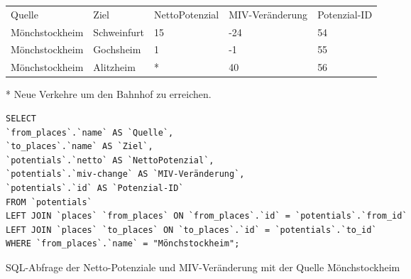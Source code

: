 \begin{tabular}{ l  l  l  l  l }
Quelle & Ziel & NettoPotenzial & MIV-Veränderung & Potenzial-ID\\ 
Mönchstockheim & Schweinfurt & 15 & -24 & 54\\ 
Mönchstockheim & Gochsheim & 1 & -1 & 55\\ 
Mönchstockheim & Alitzheim & * & 40 & 56\\ 
\end{tabular}    
\newline
\newline
* Neue Verkehre um den Bahnhof zu erreichen.
\newline
\begin{listing}[htbp]
\begin{verbatim}
SELECT
`from_places`.`name` AS `Quelle`, 
`to_places`.`name` AS `Ziel`, 
`potentials`.`netto` AS `NettoPotenzial`, 
`potentials`.`miv-change` AS `MIV-Veränderung`, 
`potentials`.`id` AS `Potenzial-ID`
FROM `potentials`
LEFT JOIN `places` `from_places` ON `from_places`.`id` = `potentials`.`from_id`
LEFT JOIN `places` `to_places` ON `to_places`.`id` = `potentials`.`to_id`
WHERE `from_places`.`name` = "Mönchstockheim";
\end{verbatim}
\caption{SQL-Abfrage der Netto-Potenziale und MIV-Veränderung mit der Quelle Mönchstockheim}\label{lst-fz-moenchstockheim}
\end{listing}